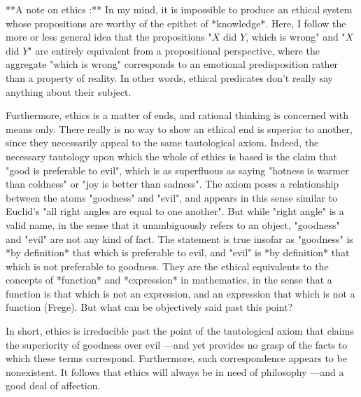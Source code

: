 \documentclass[a4paper]{article}
\begin{document}
**A note on ethics :** In my mind, it is impossible to produce an ethical system
whose propositions are worthy of the epithet of *knowledge*. Here, I follow the
more or less general idea that the propositions "$X$ did $Y$, which is wrong"
and "$X$ did $Y$" are entirely equivalent from a propositional perspective,
where the aggregate "which is wrong" corresponds to an emotional predisposition
rather than a property of reality. In other words, ethical predicates don't
really say anything about their subject.

Furthermore, ethics is a matter of ends, and rational thinking is concerned with
means only. There really is no way to show an ethical end is superior to
another, since they necessarily appeal to the same tautological axiom. Indeed,
the necessary tautology upon which the whole of ethics is based is the claim
that "good is preferable to evil", which is as superfluous as saying "hotness is
warmer than coldness" or "joy is better than sadness". The axiom poses a
relationship between the atoms "goodness" and "evil", and appears in this sense
similar to Euclid's "all right angles are equal to one another". But while
"right angle" is a valid name, in the sense that it unambiguously refers to an
object, "goodness" and "evil" are not any kind of fact. The statement is true
insofar as "goodness" is *by definition* that which is preferable to evil, and
"evil" is *by definition* that which is not preferable to goodness. They are the
ethical equivalents to the concepts of *function* and *expression* in
mathematics, in the sense that a function is that which is not an expression,
and an expression that which is not a function (Frege). But what can be objectively
said past this point?

In short, ethics is irreducible past the point of the tautological axiom that
claims the superiority of goodness over evil —and yet provides no grasp of the
facts to which these terms correspond. Furthermore, such correspondence appears
to be nonexistent. It follows that ethics will always be in need of philosophy
—and a good deal of affection. 
\end{document}
